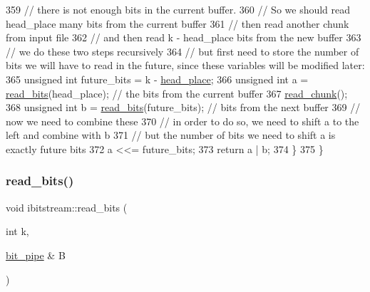 \begin{DoxyCode}
359     \textcolor{comment}{// there is not enough bits in the current buffer.}
360     \textcolor{comment}{// So we should read head\_place many bits from the current buffer}
361     \textcolor{comment}{// then read another chunk from input file}
362     \textcolor{comment}{// and then read k - head\_place bits from the new buffer}
363     \textcolor{comment}{// we do these two steps recursively}
364     \textcolor{comment}{// but first need to store the number of bits we will have to read in the future, since these variables
       will be modified later:}
365     \textcolor{keywordtype}{unsigned} \textcolor{keywordtype}{int} future\_bits = k - \hyperlink{classibitstream_a7b96359ac1534a5565e6e9b0cc53a0b3}{head\_place};
366     \textcolor{keywordtype}{unsigned} \textcolor{keywordtype}{int} a = \hyperlink{classibitstream_a2fdcaecf10fefa6942dcd5286a2696e0}{read\_bits}(head\_place); \textcolor{comment}{// the bits from the current buffer}
367     \hyperlink{classibitstream_ac62c26004436d83f337f4aeba0895e20}{read\_chunk}();
368     \textcolor{keywordtype}{unsigned} \textcolor{keywordtype}{int} b = \hyperlink{classibitstream_a2fdcaecf10fefa6942dcd5286a2696e0}{read\_bits}(future\_bits); \textcolor{comment}{// bits from the next buffer}
369     \textcolor{comment}{// now we need to combine these}
370     \textcolor{comment}{// in order to do so, we need to shift a to the left and combine with b}
371     \textcolor{comment}{// but the number of bits we need to shift a is exactly future bits}
372     a <<= future\_bits;
373     \textcolor{keywordflow}{return} a | b;
374   \}
375 \}
\end{DoxyCode}
\mbox{\label{classibitstream_a4bb7a698ab44c1e2fe21b4daa880bd6c}} 
\subsubsection{\texorpdfstring{read\+\_\+bits()}{read\_bits()}\hspace{0.1cm}{\footnotesize\ttfamily [2/2]}}
{\footnotesize\ttfamily void ibitstream\+::read\+\_\+bits (\begin{DoxyParamCaption}\item[{int}]{k,  }\item[{\hyperlink{classbit__pipe}{bit\+\_\+pipe} \&}]{B }\end{DoxyParamCaption})}



